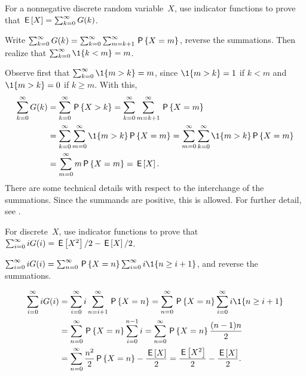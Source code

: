 \documentclass[queueing-book.tex]{subfiles}
\begin{document}
\begin{exercise}\label{ex:6}
 For a nonnegative discrete random variable~$X$, use indicator functions to prove that $\E X = \sum_{k=0}^\infty G(k)$.
\begin{hint}
Write
$\sum_{k=0}^\infty G(k) = \sum_{k=0}^\infty \sum_{m=k+1}^\infty \P{X=m}$, reverse the summations. Then realize that $\sum_{k=0}^\infty \1{k<m} = m$.
\end{hint}
\begin{solution}
Observe first that $\sum_{k=0}^\infty \1{m>k} = m$, since $\1{m>k}=1$ if $k<m$ and $\1{m>k} = 0$ if $k\geq m$. With this,
\begin{align*}
\sum_{k=0}^\infty G(k)
&= \sum_{k=0}^\infty \P{X>k}
= \sum_{k=0}^\infty \sum_{m=k+1}^\infty \P{X=m} \\
& = \sum_{k=0}^\infty \sum_{m=0}^\infty \1{m>k} \P{X=m}
= \sum_{m=0}^\infty \sum_{k=0}^\infty \1{m>k} \P{X=m} \\
&= \sum_{m=0}^\infty m\P{X=m} = \E X.
\end{align*}
There are some technical details with respect to the interchange of the summations.
Since the summands are positive, this is allowed.
For further detail, see \citet{capinski03:_probab_probl}.
\end{solution}
\end{exercise}

\begin{exercise}\label{ex:66}
For discrete~$X$,  use indicator functions to prove that
$\sum_{i=0}^\infty i G(i) = \E{X^2}/2 - \E{X}/2$.
\begin{hint}
$\sum_{i=0}^\infty i G(i) = \sum_{n=0}^\infty \P{X=n} \sum_{i=0}^\infty i \1{n\geq i+1}$,
and reverse the summations.
\end{hint}
\begin{solution}
\begin{align*}
\sum_{i=0}^\infty i G(i)
&= \sum_{i=0}^\infty i \sum_{n=i+1}^\infty \P{X=n} = \sum_{n=0}^\infty \P{X=n} \sum_{i=0}^\infty i \1{n\geq i+1} \\
&= \sum_{n=0}^\infty \P{X=n} \sum_{i=0}^{n-1}i = \sum_{n=0}^\infty \P{X=n} \frac{(n-1)n}{2} \\
&= \sum_{n=0}^\infty \frac{n^2}{2} \P{X=n} - \frac{\E X}{2}
= \frac{\E{X^2}}{2} - \frac{\E X}{2}.
\end{align*}
\end{solution}
\end{exercise}
\end{document}
